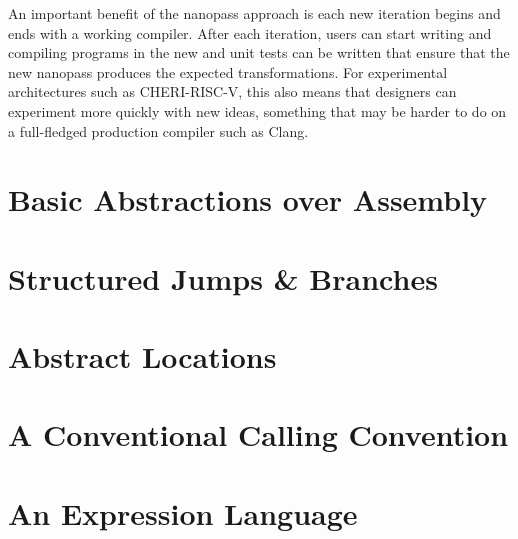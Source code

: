 \documentclass[main.tex]{subfiles}
\begin{document}
An important benefit of the nanopass approach is each new iteration begins and ends with a working compiler. After each iteration, users can start writing and compiling programs in the new \il{} and unit tests can be written that ensure that the new \gls{nanopass} produces the expected transformations. For experimental architectures such as CHERI-RISC-V, this also means that designers can experiment more quickly with new ideas, something that may be harder to do on a full-fledged production compiler such as Clang.

\section{Basic Abstractions over Assembly}

\section{Structured Jumps \& Branches}

\section{Abstract Locations}

\section{A Conventional Calling Convention}

\section{An Expression Language}

\biblio{}
\onlyinsubfile{\glsaddall\printglossaries}
\end{document}
